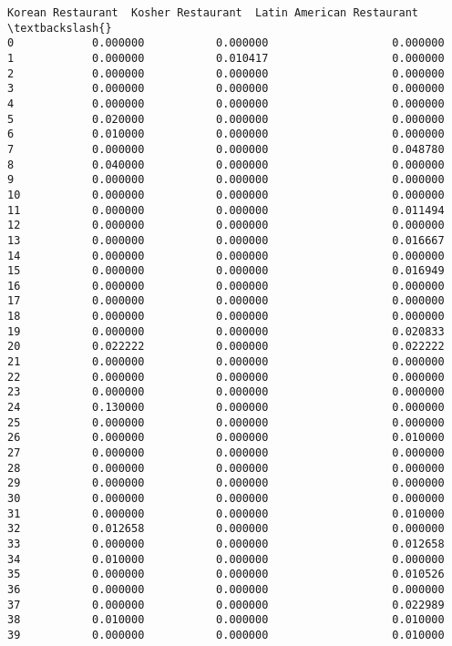 \documentclass[11pt]{article}
\begin{document}
\begin{tcolorbox}[breakable, size=fbox, boxrule=.5pt, pad at break*=1mm, opacityfill=0]
\begin{Verbatim}[commandchars=\\\{\}]
    Korean Restaurant  Kosher Restaurant  Latin American Restaurant  \textbackslash{}
0            0.000000           0.000000                   0.000000
1            0.000000           0.010417                   0.000000
2            0.000000           0.000000                   0.000000
3            0.000000           0.000000                   0.000000
4            0.000000           0.000000                   0.000000
5            0.020000           0.000000                   0.000000
6            0.010000           0.000000                   0.000000
7            0.000000           0.000000                   0.048780
8            0.040000           0.000000                   0.000000
9            0.000000           0.000000                   0.000000
10           0.000000           0.000000                   0.000000
11           0.000000           0.000000                   0.011494
12           0.000000           0.000000                   0.000000
13           0.000000           0.000000                   0.016667
14           0.000000           0.000000                   0.000000
15           0.000000           0.000000                   0.016949
16           0.000000           0.000000                   0.000000
17           0.000000           0.000000                   0.000000
18           0.000000           0.000000                   0.000000
19           0.000000           0.000000                   0.020833
20           0.022222           0.000000                   0.022222
21           0.000000           0.000000                   0.000000
22           0.000000           0.000000                   0.000000
23           0.000000           0.000000                   0.000000
24           0.130000           0.000000                   0.000000
25           0.000000           0.000000                   0.000000
26           0.000000           0.000000                   0.010000
27           0.000000           0.000000                   0.000000
28           0.000000           0.000000                   0.000000
29           0.000000           0.000000                   0.000000
30           0.000000           0.000000                   0.000000
31           0.000000           0.000000                   0.010000
32           0.012658           0.000000                   0.000000
33           0.000000           0.000000                   0.012658
34           0.010000           0.000000                   0.000000
35           0.000000           0.000000                   0.010526
36           0.000000           0.000000                   0.000000
37           0.000000           0.000000                   0.022989
38           0.010000           0.000000                   0.010000
39           0.000000           0.000000                   0.010000


\end{Verbatim}
\end{tcolorbox}
\end{document}

